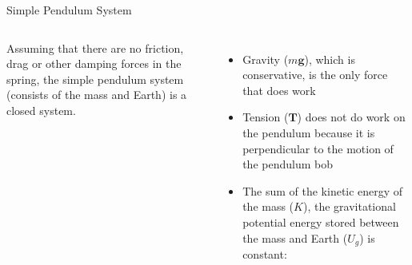 \documentclass[12pt,compress,aspectratio=169]{beamer}
\begin{document}
\begin{frame}{Simple Pendulum System}
  \begin{columns}
    Assuming that there are no friction, drag or other damping forces in the
    spring, the simple pendulum system (consists of the mass and Earth) is a
    closed system.
    \begin{itemize}
    \item Gravity ($m\bm g$), which is conservative, is the only force that
      does work
    \item Tension ($\bm T$) does not do work on the pendulum because it is
      perpendicular to the motion of the pendulum bob
    \item The sum of the kinetic energy of the mass ($K$), the gravitational
      potential energy stored between the mass and Earth ($U_g$) is constant:

    \end{itemize}
    
    \centering
  \end{columns}
\end{frame}
\end{document}
